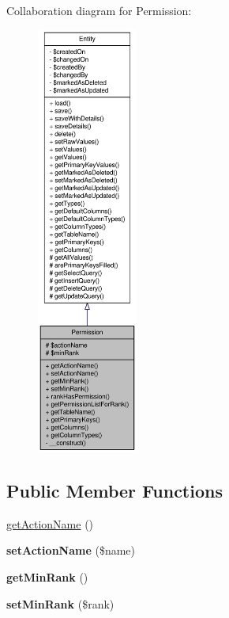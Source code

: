 Collaboration diagram for Permission:\nopagebreak
\begin{figure}[H]
\begin{center}
\leavevmode
\includegraphics[height=400pt]{classPermission__coll__graph}
\end{center}
\end{figure}
\subsection*{Public Member Functions}
\begin{DoxyCompactItemize}
\item 
\hyperlink{classPermission_a0c1a23daf6f499100c92dcbbcef05416}{getActionName} ()
\item 
\hypertarget{classPermission_a0c35c0690e810975dab77df52ca619e6}{
{\bfseries setActionName} (\$name)}
\label{classPermission_a0c35c0690e810975dab77df52ca619e6}

\item 
\hypertarget{classPermission_a02f2ba7b284c068c0afde0fb92a9cd28}{
{\bfseries getMinRank} ()}
\label{classPermission_a02f2ba7b284c068c0afde0fb92a9cd28}

\item 
\hypertarget{classPermission_a7e6d42d69b97d2081c079b965ee0aa08}{
{\bfseries setMinRank} (\$rank)}
\label{classPermission_a7e6d42d69b97d2081c079b965ee0aa08}

\end{DoxyCompactItemize}

